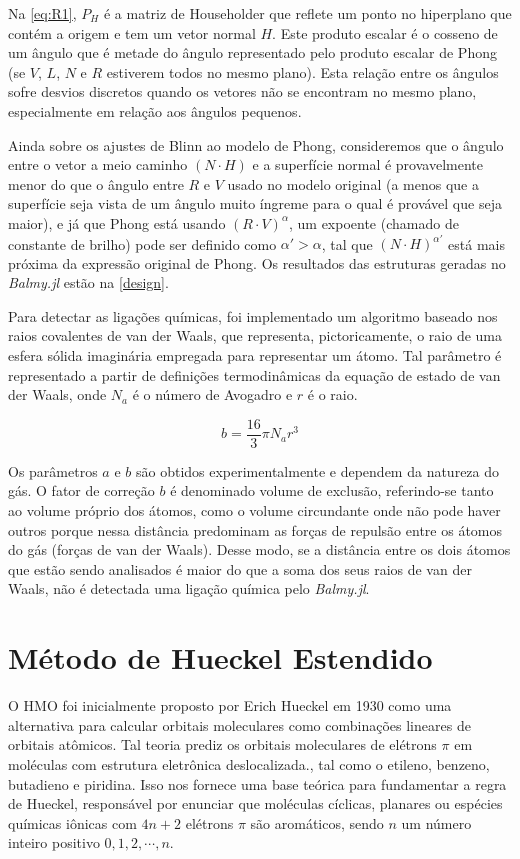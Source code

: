 Na \autoref{eq:R1}, $P_H$ é a matriz de Householder que reflete um ponto no hiperplano que contém a origem e tem um vetor normal $H$. Este produto escalar é o cosseno de um ângulo que é metade do ângulo representado pelo produto escalar de Phong (se $V$, $L$, $N$ e $R$ estiverem todos no mesmo plano). Esta relação entre os ângulos sofre desvios discretos quando os vetores não se encontram no mesmo plano, especialmente em relação aos ângulos pequenos.

Ainda sobre os ajustes de Blinn ao modelo de Phong, consideremos que o ângulo entre o vetor a meio caminho $(N \cdot H)$ e a superfície normal é provavelmente menor do que o ângulo entre $R$ e $V$ usado no modelo original (a menos que a superfície seja vista de um ângulo muito íngreme para o qual é provável que seja maior), e já que Phong está usando $(R \cdot V)^\alpha$, um expoente (chamado de constante de brilho) pode ser definido como $\alpha' > \alpha$, tal que $(N \cdot H)^{\alpha'}$ está mais próxima da expressão original de Phong. Os resultados das estruturas geradas no \textit{Balmy.jl} estão na \autoref{design}.

Para detectar as ligações químicas, foi implementado um algoritmo baseado nos raios covalentes de van der Waals, que representa, pictoricamente, o raio de uma esfera sólida imaginária empregada para representar um átomo. Tal parâmetro é representado a partir de definições termodinâmicas da equação de estado de van der Waals, onde $N_a$ é o número de Avogadro e $r$ é o raio.

\begin{equation}
    b = \frac{16}{3} \pi N_a r^3
\end{equation}

Os parâmetros $a$ e $b$ são obtidos experimentalmente e dependem da natureza do gás. O fator de correção $b$ é denominado volume de exclusão, referindo-se tanto ao volume próprio dos átomos, como o volume circundante onde não pode haver outros porque nessa distância predominam as forças de repulsão entre os átomos do gás (forças de van der Waals). Desse modo, se a distância entre os dois átomos que estão sendo analisados é maior do que a soma dos seus raios de van der Waals, não é detectada uma ligação química pelo \textit{Balmy.jl}.

\section{Método de Hueckel Estendido}

O \gls{HMO} foi inicialmente proposto por Erich Hueckel em 1930 \autocite{Hckel1931} como uma alternativa para calcular orbitais moleculares como combinações lineares de orbitais atômicos\autocite{Coulson1978-ot}. Tal teoria prediz os orbitais moleculares de elétrons $\pi$ em moléculas com estrutura eletrônica deslocalizada., tal como o etileno, benzeno, butadieno e piridina. Isso nos fornece uma base teórica para fundamentar a regra de Hueckel, responsável por enunciar que moléculas cíclicas, planares ou espécies químicas iônicas com $4n + 2$ elétrons $\pi$ são aromáticos, sendo $n$ um número inteiro positivo $0, 1, 2, \cdots, n$.

